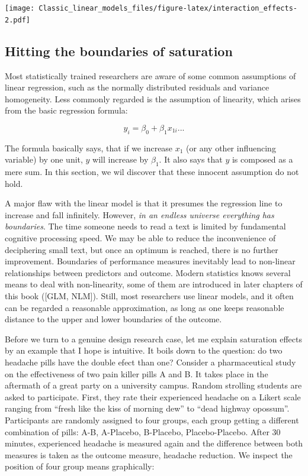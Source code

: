\documentclass[]{svmono}
\theoremstyle{definition}
\theoremstyle{definition}
\theoremstyle{definition}
\theoremstyle{remark}
\begin{document}
\texttt{[image: Classic\_linear\_models\_files/figure-latex/interaction\_effects-2.pdf]}

\subsection{Hitting the boundaries of
saturation}\label{hitting-the-boundaries-of-saturation}

Most statistically trained researchers are aware of some common
assumptions of linear regression, such as the normally distributed
residuals and variance homogeneity. Less commonly regarded is the
assumption of linearity, which arises from the basic regression formula:

\[y_i = \beta_0 + \beta_1 x_{1i} ...\]

The formula basically says, that if we increase \(x_1\) (or any other
influencing variable) by one unit, \(y\) will increase by \(\beta_1\).
It also says that \(y\) is composed as a mere sum. In this section, we
wil discover that these innocent assumption do not hold.

A major flaw with the linear model is that it presumes the regression
line to increase and fall infinitely. However, \emph{in an endless
universe everything has boundaries}. The time someone needs to read a
text is limited by fundamental cognitive processing speed. We may be
able to reduce the inconvenience of deciphering small text, but once an
optimum is reached, there is no further improvement. Boundaries of
performance measures inevitably lead to non-linear relationships between
predictors and outcome. Modern statistics knows several means to deal
with non-linearity, some of them are introduced in later chapters of
this book ({[}GLM, NLM{]}). Still, most researchers use linear models,
and it often can be regarded a reasonable approximation, as long as one
keeps reasonable distance to the upper and lower boundaries of the
outcome.

Before we turn to a genuine design research case, let me explain
saturation effects by an example that I hope is intuitive. It boils down
to the question: do two headache pills have the double efect than one?
Consider a pharmaceutical study on the effectiveness of two pain killer
pills A and B. It takes place in the aftermath of a great party on a
university campus. Random strolling students are asked to participate.
First, they rate their experienced headache on a Likert scale ranging
from ``fresh like the kiss of morning dew'' to ``dead highway opossum''.
Participants are randomly assigned to four groups, each group getting a
different combination of pills: A-B, A-Placebo, B-Placebo,
Placebo-Placebo. After 30 minutes, experienced headache is measured
again and the difference between both measures is taken as the outcome
measure, headache reduction. We inspect the position of four group means
graphically:
\end{document}
